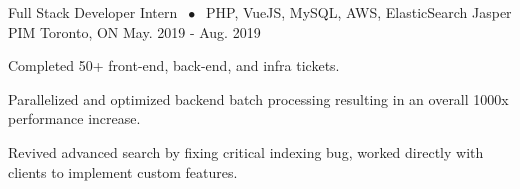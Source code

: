 \begin{cventries}


  \cventry
  {Full Stack Developer Intern $\;\bullet\;$ PHP, VueJS, MySQL, AWS, ElasticSearch} %
    {Jasper PIM} %
    {Toronto, ON} %
    {May. 2019 - Aug. 2019} %
    {
      \begin{cvitems} %
      \item {Completed 50+ front-end, back-end, and infra tickets.}
      \item {Parallelized and optimized backend batch processing resulting in an overall 1000x performance increase.}
      \item {Revived advanced search by fixing critical indexing bug, worked directly with clients to implement custom features.}
      \end{cvitems}
    }

\end{cventries}

